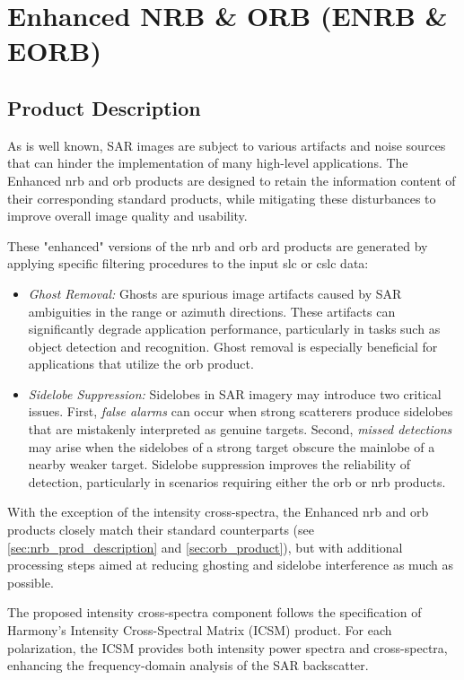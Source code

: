 \section{Enhanced NRB \& ORB (ENRB \& EORB)}

\subsection{Product Description}
\label{sec:enrb_eorb_product_description}
As is well known, SAR images are subject to various artifacts and noise sources that can hinder the implementation of many high-level applications. The Enhanced \acs{nrb} and \acs{orb} products are designed to retain the information content of their corresponding standard products, while mitigating these disturbances to improve overall image quality and usability.

These "enhanced" versions of the \acs{nrb} and \acs{orb} \acs{ard} products are generated by applying specific filtering procedures to the input \acs{slc} or \acs{cslc} data:

\begin{itemize}
    \item \textit{Ghost Removal:} Ghosts are spurious image artifacts caused by SAR ambiguities in the range or azimuth directions. These artifacts can significantly degrade application performance, particularly in tasks such as object detection and recognition. Ghost removal is especially beneficial for applications that utilize the \acs{orb} product.
    \item \textit{Sidelobe Suppression:} Sidelobes in SAR imagery may introduce two critical issues. First, \textit{false alarms} can occur when strong scatterers produce sidelobes that are mistakenly interpreted as genuine targets. Second, \textit{missed detections} may arise when the sidelobes of a strong target obscure the mainlobe of a nearby weaker target. Sidelobe suppression improves the reliability of detection, particularly in scenarios requiring either the \acs{orb} or \acs{nrb} products.
\end{itemize}

With the exception of the intensity cross-spectra, the Enhanced \acs{nrb} and \acs{orb} products closely match their standard counterparts (see \autoref{sec:nrb_prod_description} and \autoref{sec:orb_product}), but with additional processing steps aimed at reducing ghosting and sidelobe interference as much as possible.

The proposed intensity cross-spectra component follows the specification of Harmony’s Intensity Cross-Spectral Matrix (ICSM) product. For each polarization, the ICSM provides both intensity power spectra and cross-spectra, enhancing the frequency-domain analysis of the SAR backscatter.

